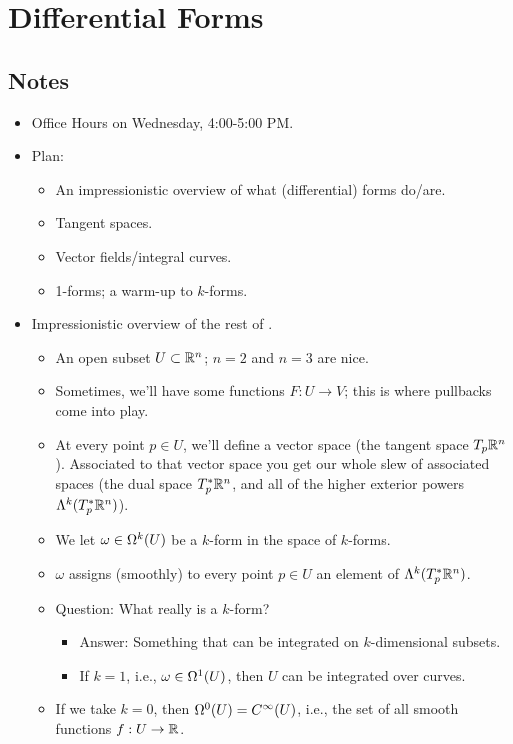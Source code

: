 \documentclass[../notes.tex]{subfiles}
\begin{document}
\chapter{Differential Forms}
\section{Notes}
\begin{itemize}
    \item {}Office Hours on Wednesday, 4:00-5:00 PM.
    \item Plan:
    \begin{itemize}
        \item An impressionistic overview of what (differential) forms do/are.
        \item Tangent spaces.
        \item Vector fields/integral curves.
        \item 1-forms; a warm-up to $k$-forms.
    \end{itemize}
    \item Impressionistic overview of the rest of \textcite{bib:DifferentialForms}.
    \begin{itemize}
        \item An open subset $U\subset\R^n$; $n=2$ and $n=3$ are nice.
        \item Sometimes, we'll have some functions $F:U\to V$; this is where pullbacks come into play.
        \item At every point $p\in U$, we'll define a vector space (the tangent space $T_p\R^n$). Associated to that vector space you get our whole slew of associated spaces (the dual space $T_p^*\R^n$, and all of the higher exterior powers $\lam[k]{T_p^*\R^n}$).
        \item We let $\omega\in\ome[k]{U}$ be a $k$-form in the space of $k$-forms.
        \item $\omega$ assigns (smoothly) to every point $p\in U$ an element of $\lam[k]{T_p^*\R^n}$.
        \item Question: What really is a $k$-form?
        \begin{itemize}
            \item Answer: Something that can be integrated on $k$-dimensional subsets.
            \item If $k=1$, i.e., $\omega\in\ome[1]{U}$, then $U$ can be integrated over curves.
        \end{itemize}
        \item If we take $k=0$, then $\ome[0]{U}=C^\infty(U)$, i.e., the set of all smooth functions $f:U\to\R$.

\end{itemize}
\end{itemize}
\end{document}
